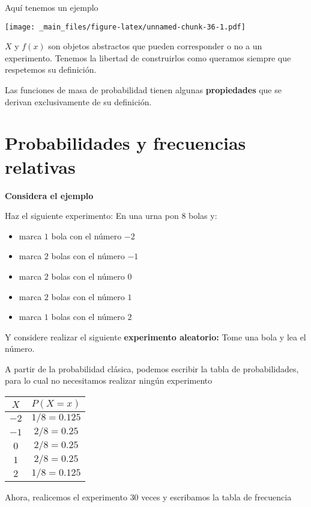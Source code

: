 \documentclass[
]{book}
\providecommand{\tightlist}{%
  \setlength{\itemsep}{0pt}\setlength{\parskip}{0pt}}
\begin{document}
Aquí tenemos un ejemplo

\texttt{[image: \_main\_files/figure-latex/unnamed-chunk-36-1.pdf]}

\(X\) y \(f(x)\) son objetos abstractos que pueden corresponder o no a un experimento. Tenemos la libertad de construirlos como queramos siempre que respetemos su definición.

Las funciones de masa de probabilidad tienen algunas \textbf{propiedades} que se derivan exclusivamente de su definición.

\hypertarget{probabilidades-y-frecuencias-relativas}{%
\section{Probabilidades y frecuencias relativas}\label{probabilidades-y-frecuencias-relativas}}

\textbf{Considera el ejemplo}

Haz el siguiente experimento: En una urna pon \(8\) bolas y:

\begin{itemize}
\tightlist
\item
  marca \(1\) bola con el número \(-2\)
\item
  marca \(2\) bolas con el número \(-1\)
\item
  marca \(2\) bolas con el número \(0\)
\item
  marca \(2\) bolas con el número \(1\)
\item
  marca \(1\) bolas con el número \(2\)
\end{itemize}

Y considere realizar el siguiente \textbf{experimento aleatorio:} Tome una bola y lea el número.

A partir de la probabilidad clásica, podemos escribir la tabla de probabilidades, para lo cual no necesitamos realizar ningún experimento

\begin{longtable}[]{@{}cc@{}}
\toprule
\(X\) & \(P(X=x)\) \\
\midrule
\endhead
\(-2\) & \(1/8=0.125\) \\
\(-1\) & \(2/8=0.25\) \\
\(0\) & \(2/8=0.25\) \\
\(1\) & \(2/8=0.25\) \\
\(2\) & \(1/8=0.125\) \\
\bottomrule
\end{longtable}

Ahora, realicemos el experimento \(30\) veces y escribamos la tabla de frecuencia
\end{document}
